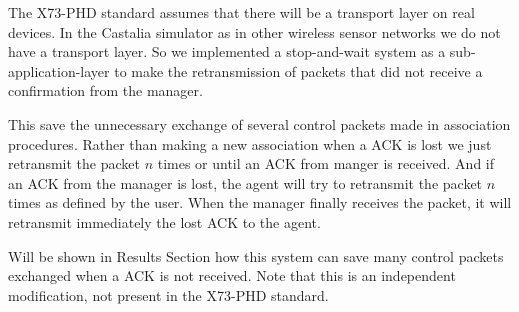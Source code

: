 The X73-PHD standard assumes that there will be a transport layer on real devices. In the Castalia simulator as in other wireless sensor networks we do not have a transport layer. So we implemented a stop-and-wait system as a sub-application-layer to make the retransmission of packets that did not receive a confirmation from the manager.

This save the unnecessary exchange of several control packets made in association procedures. Rather than making a new association when a ACK is lost we just retransmit the packet $n$ times or until an ACK from manger is received.
And if an ACK from the manager is lost, the agent will try to retransmit the packet $n$ times as defined by the user. When the manager finally receives the packet, it will retransmit immediately the lost ACK to the agent.

Will be shown in Results Section how this system can save many control packets exchanged when a ACK is not received. Note that this is an independent modification, not present in the X73-PHD standard. 
